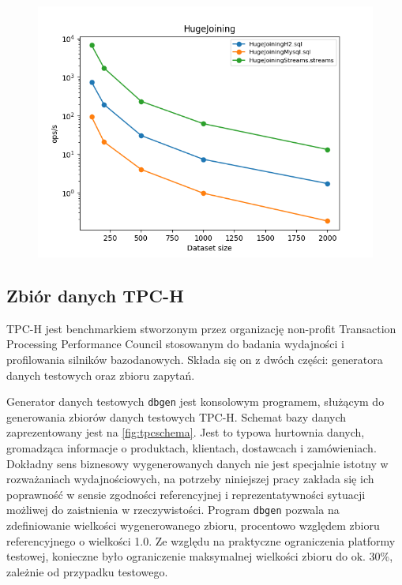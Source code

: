 \documentclass[12pt]{extarticle}
\begin{document}
\begin{figure}[H]
\centering
\includegraphics[width=13cm]{plots/HugeJoining}
\end{figure}




\subsection{Zbiór danych TPC-H}

    TPC-H jest benchmarkiem stworzonym przez organizację non-profit Transaction Processing Performance Council stosowanym do badania wydajności i profilowania silników bazodanowych. Składa się on z dwóch części: generatora danych testowych oraz zbioru zapytań.

    Generator danych testowych \texttt{dbgen} jest konsolowym programem, służącym do generowania zbiorów danych testowych TPC-H. Schemat bazy danych zaprezentowany jest na \ref{fig:tpcschema}. Jest to typowa hurtownia danych, gromadząca informacje o produktach, klientach, dostawcach i zamówieniach. Dokładny sens biznesowy wygenerowanych danych nie jest specjalnie istotny w rozważaniach wydajnościowych, na potrzeby niniejszej pracy zakłada się ich poprawność w sensie zgodności referencyjnej i reprezentatywności sytuacji możliwej do zaistnienia w rzeczywistości. Program \texttt{dbgen} pozwala na zdefiniowanie wielkości wygenerowanego zbioru, procentowo względem zbioru referencyjnego o wielkości 1.0. Ze względu na praktyczne ograniczenia platformy testowej, konieczne było ograniczenie maksymalnej wielkości zbioru do ok. 30\%, zależnie od przypadku testowego. 
\end{document}
